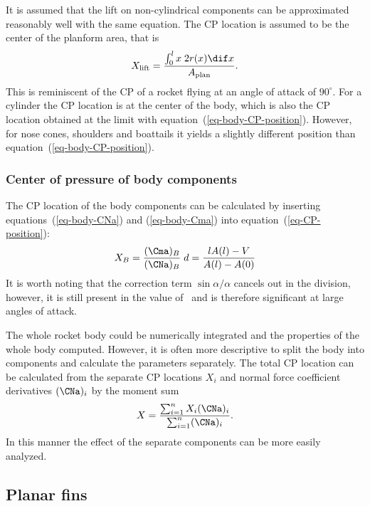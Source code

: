 It is assumed that the lift on non-cylindrical components can be
approximated reasonably well with the same equation.  The CP location
is assumed to be the center of the planform area, that is
%
\begin{equation}
X_{\rm lift} = \frac{\int_0^l x\; 2r(x)\dif x}{A_{\rm plan}}.
\end{equation}
%
This is reminiscent of the CP of a rocket flying at an angle of attack
of $90^\circ$.  For a cylinder the CP location is at the center of the
body, which is also the CP location obtained at the limit with
equation~(\ref{eq-body-CP-position}).  However, for nose cones,
shoulders and boattails it yields a slightly different position than
equation~(\ref{eq-body-CP-position}).







\subsubsection{Center of pressure of body components}

The CP location of the body components can be calculated by
inserting equations~(\ref{eq-body-CNa}) and (\ref{eq-body-Cma}) into
equation~(\ref{eq-CP-position}):
%
\begin{equation}
X_B = \frac{(\Cma)_B}{(\CNa)_B}\;d
    = \frac{lA(l)-V}{A(l)-A(0)}
\label{eq-body-CP-position}
\end{equation}
%
It is worth noting that the correction term $\sin\alpha/\alpha$
cancels out in the division, however, it is still present in the
value of \CNa\ and is therefore significant at large angles of attack.

The whole rocket body could be numerically integrated and the
properties of the whole body computed.  However, it is often more
descriptive to split the body into components and calculate the
parameters separately.  The total CP location can be calculated from
the separate CP locations $X_i$ and normal force coefficient
derivatives $(\CNa)_i$ by the moment sum
%
\begin{equation}
X = \frac{\sum_{i=1}^n X_i(\CNa)_i}{\sum_{i=1}^n (\CNa)_i}.
\label{eq-moment-sum}
\end{equation}
%
In this manner the effect of the separate components can be more
easily analyzed.



\subsection{Planar fins}
\label{sec-planar-fins}

